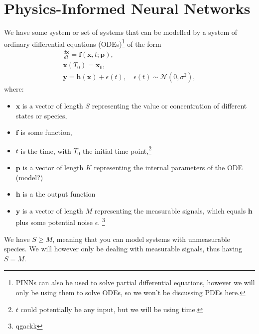 %
%



\section{Physics-Informed Neural Networks}

We have some system or set of systems that can be modelled by a system of ordinary differential equations (ODEs)\footnote{PINNs can also be used to solve partial differential equations, however we will only be using them to solve ODEs, so we won't be discussing PDEs here.} 
of the form
\begin{subequations} \label{eq:ode}
\begin{gather}
	\frac{d \mathbf{x}}{d t}=\boldsymbol{f}(\mathbf{x}, t ; \mathbf{p}), \label{eq:ode_a} \\
	\mathbf{x}\left(T_{0}\right)=\mathbf{x}_{0}, \label{eq:ode_b} \\
	\mathbf{y}=\boldsymbol{h}(\mathbf{x})+\epsilon(t), \quad \epsilon(t) \sim \mathcal{N}\left(0, \sigma^{2}\right), \label{eq:ode_c}
\end{gather}
\end{subequations}
where:
\begin{itemize} %
	\item $\mathbf{x}$ is a vector of length $S$ representing the value or concentration of different states or species,
	\item $\mathbf{f}$ is some function,
	\item $t$ is the time, with $T_0$ the initial time point,\footnote{$t$ could potentially be any input, but we will be using time.}
	\item $\mathbf{p}$ is a vector of length $K$ representing the internal parameters of the ODE (model?)
	\item $\mathbf{h}$ is a the output function %
	\item $\mathbf{y}$ is a vector of length $M$ representing the measurable signals, which equals $\mathbf{h}$ plus some potential noise $\epsilon$. \footnote{qgackk}
\end{itemize}
We have $S \geq M$, meaning that you can model systems with unmeasurable species. We will however only be dealing with measurable signals, thus having $S=M$. %

